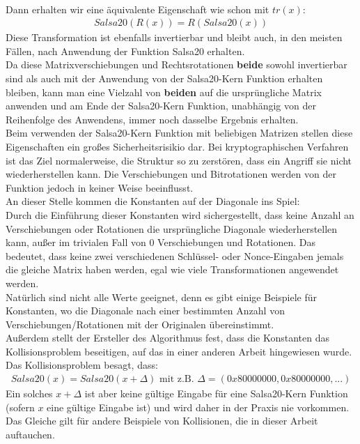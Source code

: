 \documentclass[course=erap]{aspdoc}
\begin{document}
\vspace{1mm}
\\Dann erhalten wir eine äquivalente Eigenschaft wie schon mit $tr(x)$:
\begin{gather*}
    Salsa20(R(x)) = R(Salsa20(x))
\end{gather*}
Diese Transformation ist ebenfalls invertierbar und bleibt auch, in den meisten Fällen, nach Anwendung der Funktion Salsa20 erhalten.\cite{salsa20security}
\vspace{1mm}
\\Da diese Matrixverschiebungen und Rechtsrotationen \textbf{beide} sowohl invertierbar sind als auch mit der Anwendung von der Salsa20-Kern Funktion erhalten bleiben,
kann man eine Vielzahl von \textbf{beiden} auf die ursprüngliche Matrix anwenden und am Ende der Salsa20-Kern Funktion, unabhängig von der Reihenfolge des Anwendens, immer noch dasselbe Ergebnis erhalten.
\vspace{1mm}
\\Beim verwenden der Salsa20-Kern Funktion mit beliebigen Matrizen stellen diese Eigenschaften ein großes Sicherheitsrisikio dar.
Bei kryptographischen Verfahren ist das Ziel normalerweise, die Struktur so zu zerstören, dass ein Angriff sie nicht wiederherstellen kann.
Die Verschiebungen und Bitrotationen werden von der Funktion jedoch in keiner Weise beeinflusst.
\vspace{1mm}
\\An dieser Stelle kommen die Konstanten auf der Diagonale ins Spiel:
\vspace{2mm}
\\Durch die Einführung dieser Konstanten wird sichergestellt, dass keine Anzahl an Verschiebungen oder Rotationen die ursprüngliche Diagonale wiederherstellen kann,
außer im trivialen Fall von 0 Verschiebungen und Rotationen. Das bedeutet, dass keine zwei verschiedenen Schlüssel- oder Nonce-Eingaben
jemals die gleiche Matrix haben werden, egal wie viele Transformationen angewendet werden.\cite{salsa20security}
\vspace{1mm}
\\Natürlich sind nicht alle Werte geeignet, denn es gibt einige Beispiele für Konstanten,
wo die Diagonale nach einer bestimmten Anzahl von Verschiebungen/Rotationen mit der Originalen übereinstimmt.
\vspace{1mm}
\\Außerdem stellt der Ersteller des Algorithmus fest\cite{ResponseOnTheSalsa20Core}, dass die Konstanten das Kollisionsproblem beseitigen,
auf das in einer anderen Arbeit\cite{onTheSalsa20Core} hingewiesen wurde.\\
Das Kollisionsproblem besagt, dass:
\begin{gather*} Salsa20(x) = Salsa20(x + \Delta) \text{  mit z.B.  } \Delta=(0x80000000,0x80000000,...) \end{gather*}
Ein solches $x+\Delta$ ist aber keine gültige Eingabe für eine Salsa20-Kern Funktion (sofern $x$ eine gültige Eingabe ist) und wird daher in der Praxis nie vorkommen.
Das Gleiche gilt für andere Beispiele von Kollisionen, die in dieser Arbeit auftauchen.
\end{document}
